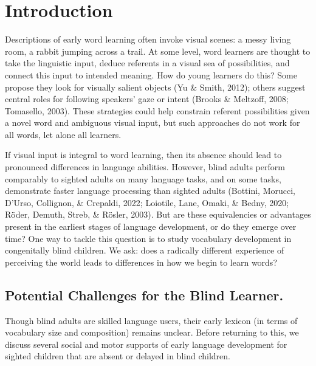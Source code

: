 \documentclass[
  man,floatsintext]{apa6}
\begin{document}
\hypertarget{introduction}{%
\section{Introduction}\label{introduction}}

Descriptions of early word learning often invoke visual scenes: a messy living room, a rabbit jumping across a trail. At some level, word learners are thought to take the linguistic input, deduce referents in a visual sea of possibilities, and connect this input to intended meaning. How do young learners do this? Some propose they look for visually salient objects (Yu \& Smith, 2012); others suggest central roles for following speakers' gaze or intent (Brooks \& Meltzoff, 2008; Tomasello, 2003). These strategies could help constrain referent possibilities given a novel word and ambiguous visual input, but such approaches do not work for all words, let alone all learners.

If visual input is integral to word learning, then its absence should lead to pronounced differences in language abilities. However, blind adults perform comparably to sighted adults on many language tasks, and on some tasks, demonstrate faster language processing than sighted adults (Bottini, Morucci, D'Urso, Collignon, \& Crepaldi, 2022; Loiotile, Lane, Omaki, \& Bedny, 2020; Röder, Demuth, Streb, \& Rösler, 2003). But are these equivalencies or advantages present in the earliest stages of language development, or do they emerge over time? One way to tackle this question is to study vocabulary development in congenitally blind children. We ask: does a radically different experience of perceiving the world leads to differences in how we begin to learn words?

\hypertarget{potential-challenges-for-the-blind-learner.}{%
\subsection{Potential Challenges for the Blind Learner.}\label{potential-challenges-for-the-blind-learner.}}

Though blind adults are skilled language users, their early lexicon (in terms of vocabulary size and composition) remains unclear. Before returning to this, we discuss several social and motor supports of early language development for sighted children that are absent or delayed in blind children.
\end{document}
